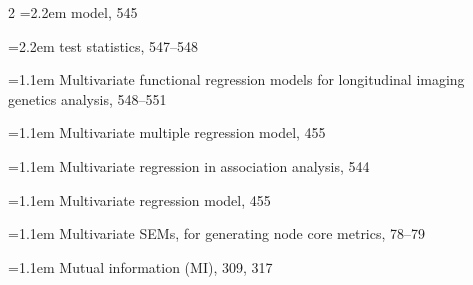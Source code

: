 \begin{multicols}{2}
\noindent\hangindent=2.2em \hspace*{1.1em}model, 545\par
\noindent\hangindent=2.2em \hspace*{1.1em}test statistics, 547--548\par
\noindent\hangindent=1.1em Multivariate functional regression models for longitudinal imaging genetics analysis, 548--551\par
\noindent\hangindent=1.1em Multivariate multiple regression model, 455\par
\noindent\hangindent=1.1em Multivariate regression in association analysis, 544\par
\noindent\hangindent=1.1em Multivariate regression model, 455\par
\noindent\hangindent=1.1em Multivariate SEMs, for generating node core metrics, 78--79\par
\noindent\hangindent=1.1em Mutual information (MI), 309, 317\par


\end{multicols}
